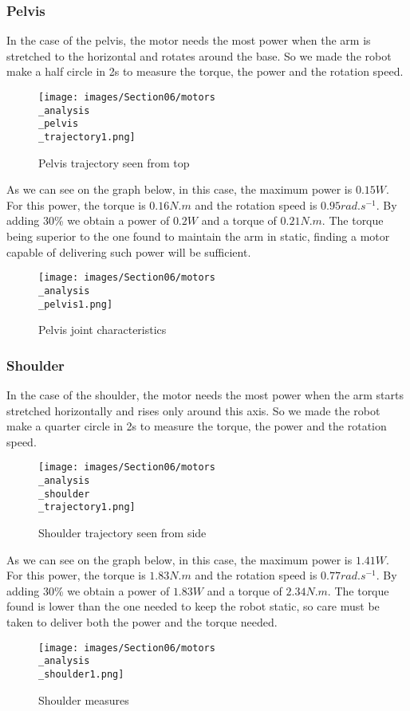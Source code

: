 \subsubsection{Pelvis}

In the case of the pelvis, the motor needs the most power when the arm is stretched to the horizontal and rotates around the base. So we made the robot make a half circle in 2s to measure the torque, the power and the rotation speed.
\begin{figure}[ht]
    \centering
    \texttt{[image: images/Section06/motors\\\_analysis\\\_pelvis\\\_trajectory1.png]}
    \caption{Pelvis trajectory seen from top}
    \label{fig:mesh15}
\end{figure}
\FloatBarrier

\bigbreak
As we can see on the graph below, in this case, the maximum power is $0.15W$. For this power, the torque is $0.16N.m$ and the rotation speed is $0.95rad.s^{-1}$. By adding 30\% we obtain a power of $0.2W$ and a torque of $0.21N.m$. The torque being superior to the one found to maintain the arm in static, finding a motor capable of delivering such power will be sufficient.
\begin{figure}[ht]
    \centering
    \texttt{[image: images/Section06/motors\\\_analysis\\\_pelvis1.png]}
    \caption{Pelvis joint characteristics}
    \label{fig:mesh15}
\end{figure}
\FloatBarrier

\subsubsection{Shoulder}

In the case of the shoulder, the motor needs the most power when the arm starts stretched horizontally and rises only around this axis. So we made the robot make a quarter circle in 2s to measure the torque, the power and the rotation speed.
\begin{figure}[ht]
    \centering
    \texttt{[image: images/Section06/motors\\\_analysis\\\_shoulder\\\_trajectory1.png]}
    \caption{Shoulder trajectory seen from side}
    \label{fig:mesh15}
\end{figure}
\FloatBarrier

\bigbreak
As we can see on the graph below, in this case, the maximum power is $1.41W$. For this power, the torque is $1.83N.m$ and the rotation speed is $0.77rad.s^{-1}$. By adding 30\% we obtain a power of $1.83W$ and a torque of $2.34N.m$. The torque found is lower than the one needed to keep the robot static, so care must be taken to deliver both the power and the torque needed.
\begin{figure}[ht]
    \centering
    \texttt{[image: images/Section06/motors\\\_analysis\\\_shoulder1.png]}
    \caption{Shoulder measures}
    \label{fig:mesh15}
\end{figure}
\FloatBarrier

